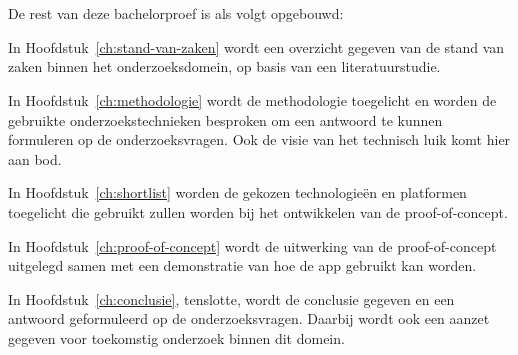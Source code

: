 \section{}
\label{sec:opzet-bachelorproef}
De rest van deze bachelorproef is als volgt opgebouwd:

In Hoofdstuk~\ref{ch:stand-van-zaken} wordt een overzicht gegeven van de stand van zaken binnen het onderzoeksdomein, op basis van een literatuurstudie.

In Hoofdstuk~\ref{ch:methodologie} wordt de methodologie toegelicht en worden de gebruikte onderzoekstechnieken besproken om een antwoord te kunnen formuleren op de onderzoeksvragen.
Ook de visie van het technisch luik komt hier aan bod.

In Hoofdstuk~\ref{ch:shortlist} worden de gekozen technologie\"en en platformen toegelicht die gebruikt zullen worden bij het ontwikkelen van de proof-of-concept.

In Hoofdstuk~\ref{ch:proof-of-concept} wordt de uitwerking van de proof-of-concept uitgelegd samen met een demonstratie van hoe de app gebruikt kan worden.

In Hoofdstuk~\ref{ch:conclusie}, tenslotte, wordt de conclusie gegeven en een antwoord geformuleerd op de onderzoeksvragen.
Daarbij wordt ook een aanzet gegeven voor toekomstig onderzoek binnen dit domein.